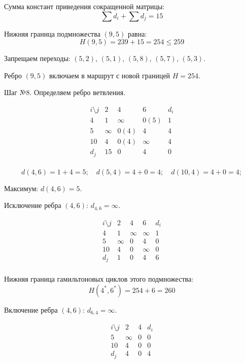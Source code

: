 \documentclass{article}
\begin{document}
Сумма констант приведения сокращенной матрицы:
\[
    \sum d_i + \sum d_j = 15
\]

Нижняя граница подмножества $(9,5)$ равна:
\[
    H(9,5) = 239 + 15 = 254 \leq 259
\]

Запрещаем переходы: $(5,2)$, $(5,1)$, $(5,8)$, $(5,7)$, $(5,3)$.

Ребро $(9,5)$ включаем в маршрут с новой границей $H=254$.

Шаг №8.
Определяем ребро ветвления.

\[
    \begin{array}{c|ccc|c}
        i \setminus j & 2      & 4      & 6      & d_i \\
        \hline
        4             & 1      & \infty & 0(5)   & 1   \\
        5             & \infty & 0(4)   & 4      & 4   \\
        10            & 4      & 0(4)   & \infty & 4   \\
        \hline
        d_j           & 15     & 0      & 4      & 0   \\
    \end{array}
\]

\[
    d(4,6) = 1 + 4 = 5; \quad d(5,4) = 4 + 0 = 4; \quad d(10,4) = 4 + 0 = 4;
\]

Максимум: $d(4,6)=5$.

Исключение ребра $(4,6)$: $d_{4,6}=\infty$.

\[
    \begin{array}{c|ccc|c}
        i \setminus j & 2      & 4      & 6      & d_i \\
        \hline
        4             & 1      & \infty & \infty & 1   \\
        5             & \infty & 0      & 4      & 0   \\
        10            & 4      & 0      & \infty & 0   \\
        \hline
        d_j           & 1      & 0      & 4      & 6   \\
    \end{array}
\]

Нижняя граница гамильтоновых циклов этого подмножества:
\[
    H(4^*,6^*) = 254 + 6 = 260
\]

Включение ребра $(4,6)$: $d_{6,4}=\infty$.

\[
    \begin{array}{c|cc|c}
        i \setminus j & 2      & 4 & d_i \\
        \hline
        5             & \infty & 0 & 0   \\
        10            & 4      & 0 & 0   \\
        \hline
        d_j           & 4      & 0 & 4   \\
    \end{array}
\]
\end{document}
